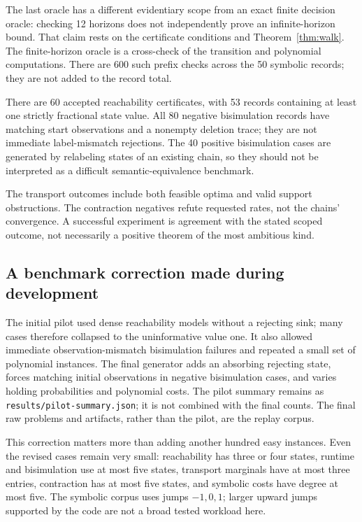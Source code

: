 \documentclass[11pt,letterpaper]{article}
\theoremstyle{definition}\newtheorem{definition}[theorem]{Definition}
\theoremstyle{remark}\newtheorem{remark}[theorem]{Remark}
\newcommand{\code}[1]{\texttt{#1}}
\begin{document}
The last oracle has a different evidentiary scope from an exact finite decision oracle: checking 12 horizons does not independently prove an infinite-horizon bound. That claim rests on the certificate conditions and Theorem~\ref{thm:walk}. The finite-horizon oracle is a cross-check of the transition and polynomial computations. There are 600 such prefix checks across the 50 symbolic records; they are not added to the record total.



There are 60 accepted reachability certificates, with 53 records containing at least one strictly fractional state value. All 80 negative bisimulation records have matching start observations and a nonempty deletion trace; they are not immediate label-mismatch rejections. The 40 positive bisimulation cases are generated by relabeling states of an existing chain, so they should not be interpreted as a difficult semantic-equivalence benchmark.

The transport outcomes include both feasible optima and valid support obstructions. The contraction negatives refute requested rates, not the chains' convergence. A successful experiment is agreement with the stated scoped outcome, not necessarily a positive theorem of the most ambitious kind.

\subsection{A benchmark correction made during development}
The initial pilot used dense reachability models without a rejecting sink; many cases therefore collapsed to the uninformative value one. It also allowed immediate observation-mismatch bisimulation failures and repeated a small set of polynomial instances. The final generator adds an absorbing rejecting state, forces matching initial observations in negative bisimulation cases, and varies holding probabilities and polynomial costs. The pilot summary remains as \code{results/pilot-summary.json}; it is not combined with the final counts. The final raw problems and artifacts, rather than the pilot, are the replay corpus.

This correction matters more than adding another hundred easy instances. Even the revised cases remain very small: reachability has three or four states, runtime and bisimulation use at most five states, transport marginals have at most three entries, contraction has at most five states, and symbolic costs have degree at most five. The symbolic corpus uses jumps $-1,0,1$; larger upward jumps supported by the code are not a broad tested workload here.
\end{document}
